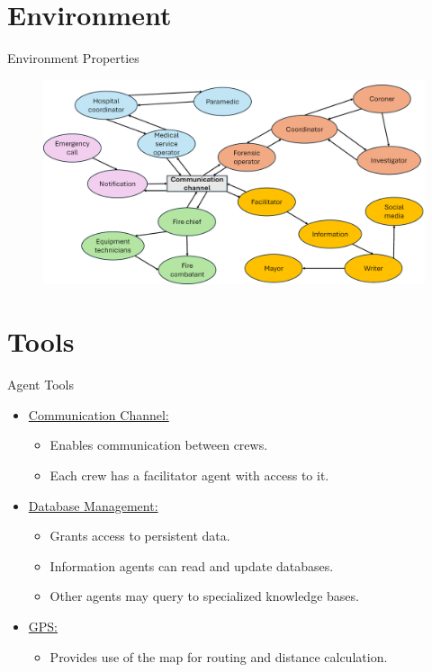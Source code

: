 \documentclass{beamer}
\begin{document}
\section{Environment}
\begin{frame}{Environment Properties}
    \begin{figure}[H]
        \centering
        \includegraphics[width=2\textwidth]{../figures/diagram_between_agents.png}
    \end{figure}
\end{frame}

\section{Tools}
\begin{frame}{Agent Tools}
    \begin{itemize}
        \item \underline{Communication Channel:}
        \begin{itemize}
            \item Enables \alert{communication} between crews.
            \item Each crew has a \alert{facilitator} agent with access to it.
        \end{itemize}
        \item \underline{Database Management:}
        \begin{itemize}
            \item Grants access to \alert{persistent} data.
            \item \alert{Information} agents can read and update databases.
            \item Other agents may query to \alert{specialized knowledge} bases.
        \end{itemize}
        \item \underline{GPS:}
        \begin{itemize}
            \item Provides use of the map for \alert{routing} and \alert{distance calculation}.
        \end{itemize}
    \end{itemize}
\end{frame}
\end{document}
